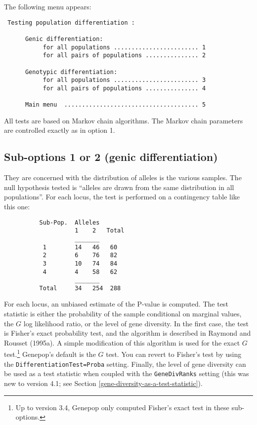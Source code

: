 \documentclass[
  12pt,
]{book}
\begin{document}
The following menu appears:

\begin{verbatim}
 Testing population differentiation :

      Genic differentiation:
           for all populations ........................ 1
           for all pairs of populations ............... 2

      Genotypic differentiation:
           for all populations ........................ 3
           for all pairs of populations ............... 4

      Main menu  ...................................... 5
\end{verbatim}

All tests are based on Markov chain algorithms. The Markov chain parameters are controlled exactly as in option 1.

\hypertarget{sub-options-1-or-2-genic-differentiation}{%
\subsection{Sub-options 1 or 2 (genic differentiation)}\label{sub-options-1-or-2-genic-differentiation}}

They are concerned with the distribution of alleles is the various samples. The null hypothesis tested is ``alleles are drawn from the same distribution in all populations''. For each locus, the test is performed on a contingency table like this one:

\begin{verbatim}
          Sub-Pop.  Alleles
                    1    2   Total
                    _______
           1        14   46   60
           2        6    76   82
           3        10   74   84
           4        4    58   62
                    _______
          Total     34   254  288
\end{verbatim}

For each locus, an unbiased estimate of the P-value is computed. The test statistic is either the probability of the sample conditional on marginal values, the \(G\) log likelihood ratio, or the level of gene diversity. In the first case, the test is Fisher's exact probability test, and the algorithm is described in Raymond and Rousset (1995a). A simple modification of this algorithm is used for the exact \(G\) test.\footnote{Up to version 3.4, Genepop only computed Fisher's exact test in these sub-options.} Genepop's default is the \(G\) test. You can revert to Fisher's test by using the \texttt{DifferentiationTest=Proba} setting. Finally, the level of gene diversity can be used as a test statistic when coupled with the \texttt{GeneDivRanks} setting (this was new to version 4.1; see Section \ref{gene-diversity-as-a-test-statistic}).
\end{document}
